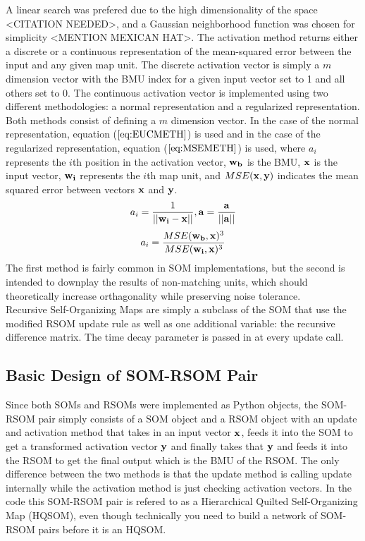 \documentclass[a4paper,10pt]{article}
\begin{document}
A linear search was prefered due to the high dimensionality of the space <CITATION NEEDED>, and a
Gaussian neighborhood function was chosen for simplicity <MENTION MEXICAN HAT>.  The activation
method returns either a discrete or a continuous representation of the mean-squared error between
the input and any given map unit. The discrete activation vector is simply a $m$ dimension vector
with the BMU index for a given input vector set to 1 and all others set to 0. The continuous
activation vector is implemented using two different methodologies: a normal representation and a
regularized representation. Both methods consist of defining a $m$ dimension vector.  In the case
of the normal representation, equation ($\ref{eq:EUCMETH}$) is used and in the case of the
regularized representation, equation ($\ref{eq:MSEMETH}$) is used, where $a_i$ represents the
$i$th position in the activation vector, $\bold{w_b}$ is the BMU, $\bold{x}$ is the input vector,
$\bold{w_i}$ represents the $i$th map unit, and $MSE(\bold{x},\bold{y})$ indicates the mean squared
error between vectors $\bold{x}$ and $\bold{y}$.
\begin{equation} \label{eq:EUCMETH}
 a_i = \frac{1}{||\bold{w_i}-\bold{x}||}, \bold{a} = \frac{\bold{a}}{||\bold{a}||}
\end{equation}
\begin{equation} \label{eq:MSEMETH}
 a_i = \frac{MSE(\bold{w_b}, \bold{x})^3}{MSE(\bold{w_i},\bold{x})^3}
\end{equation}
The first method is fairly common in SOM implementations, but the second is intended to downplay the
results of non-matching units, which should theoretically increase orthagonality while preserving
noise tolerance.
\\
Recursive Self-Organizing Maps are simply a subclass of the SOM that use the modified RSOM update
rule as well as one additional variable: the recursive difference matrix.  The time decay parameter
is passed in at every update call.
\subsection{Basic Design of SOM-RSOM Pair}
Since both SOMs and RSOMs were implemented as Python objects, the SOM-RSOM pair simply consists of
a SOM object and a RSOM object with an update and activation method that takes in an input vector
$\bold{x}$, feeds it into the SOM to get a transformed activation vector $\bold{y}$ and finally
takes that $\bold{y}$ and feeds it into the RSOM to get the final output which is the BMU of the
RSOM.  The only difference between the two methods is that the update method is calling update
internally while the activation method is just checking activation vectors.  In the code this
SOM-RSOM pair is refered to as a Hierarchical Quilted Self-Organizing Map (HQSOM), even though
technically you need to build a network of SOM-RSOM pairs before it is an HQSOM.
\end{document}
